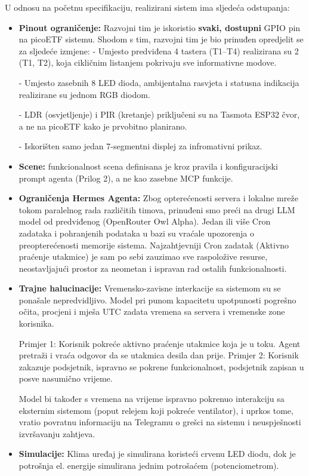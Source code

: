 \documentclass[11pt,a4paper]{article}
\begin{document}
U odnosu na početnu specifikaciju, realizirani sistem ima sljedeća odstupanja:
\begin{itemize}[nosep]
      \item \textbf{Pinout ograničenje:} Razvojni tim je iskoristio \textbf{svaki, dostupni} GPIO pin na picoETF sistemu.
            Shodom s tim, razvojni tim je bio prinuđen opredjelit se za sljedeće izmjene:
            - Umjesto predviđena 4 tastera (T1--T4) realizirana su 2
            (T1, T2), koja cikličnim listanjem pokrivaju sve informativne modove.

            - Umjesto zasebnih 8 LED dioda, ambijentalna rasvjeta i statusna
            indikacija realizirane su jednom RGB diodom.

            - LDR (osvjetljenje) i PIR (kretanje) priključeni
            su na Tasmota ESP32 čvor, a ne na picoETF kako je prvobitno planirano.

            - Iskorišten samo jedan 7-segmentni displej za infromativni prikaz.
      \item \textbf{Scene:} funkcionalnost scena definisana je kroz pravila i konfiguracijski
            prompt agenta (Prilog 2), a ne kao zasebne MCP funkcije.
      \item \textbf{Ograničenja Hermes Agenta: }
            Zbog opterećenosti servera i lokalne mreže tokom paralelnog rada različitih timova,
            prinuđeni smo preći na drugi LLM model od predviđenog (OpenRouter Owl Alpha).
            Jedan ili više Cron zadataka i pohranjenih podataka u bazi su vraćale upozorenja o preopterećenosti
            memorije sistema. Najzahtjevniji Cron zadatak (Aktivno praćenje utakmice) je sam po sebi zauzimao sve raspoložive resurse,
            neostavljajući prostor za neometan i ispravan rad ostalih funkcionalnosti.
      \item \textbf{Trajne halucinacije:}
            Vremensko-zavisne interkacije sa sistemom su se ponašale nepredvidljivo.
            Model pri punom kapacitetu upotpunosti pogrešno očita, procjeni i mješa UTC zadata vremena sa servera i vremenske zone korisnika.

            Primjer 1: Korisnik pokreće aktivno praćenje utakmice koja je u toku. Agent pretraži i vraća odgovor da se utakmica desila dan prije.
            Primjer 2: Korisnik zakazuje podsjetnik, ispravno se pokrene funkcionalnost, podsjetnik zapisan u posve nasumično vrijeme.

            Model bi također s vremena na vrijeme ispravno pokrenuo interakciju sa eksternim sistemom (poput relejem koji pokreće ventilator),
            i uprkos tome, vratio povratnu informaciju na Telegramu o grešci na sistemu i neuspješnosti izvršavanju zahtjeva.
      \item \textbf{Simulacije: } Klima uređaj je simulirana koristeći crvenu LED diodu, dok je potrošnja el. energije simulirana jednim potrošaćem (potenciometrom).

\end{itemize}
\end{document}
